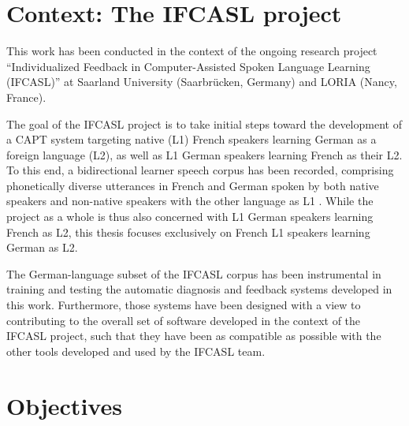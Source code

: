 \section{Context: The IFCASL project}
\label{sec:intro:ifcasl}

This work has been conducted in the context of the ongoing research project ``Individualized Feedback in Computer-Assisted Spoken Language Learning (IFCASL)'' at Saarland University (Saarbrücken, Germany) and LORIA (Nancy, France). 

The goal of the IFCASL project is to take initial steps toward the development of a CAPT system targeting
native (L1) French speakers learning German as a foreign language (L2), 
as well as
L1 German speakers learning French as their L2. To this end, a bidirectional learner speech corpus has been recorded, comprising phonetically diverse utterances in French and German spoken by both native speakers and non-native speakers with the other language as L1 \citep{Fauth2014,Trouvain2013}.  While the project as a whole is thus also concerned with L1 German speakers learning French as L2, this thesis focuses exclusively on French L1 speakers learning German as L2. 


The German-language subset of the IFCASL corpus has been instrumental in training and testing the automatic diagnosis and feedback systems developed in this work. Furthermore, those systems have been designed with a view to contributing to the overall set of software developed in the context of the IFCASL project, such that they have been as compatible as possible with the other tools developed and used by the IFCASL team. %


\section{Objectives}
\label{sec:intro:objectives}


